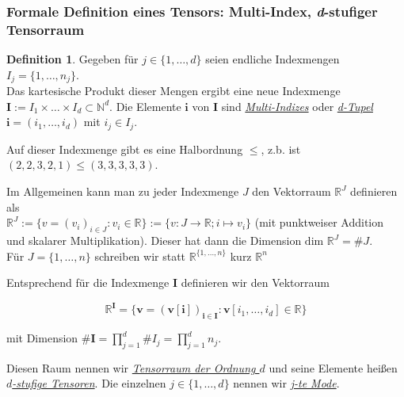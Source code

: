 \documentclass[11pt]{article} %
\theoremstyle{definition}
\newtheorem{definition}[thm]{Definition}
\numberwithin{equation}{section}
\begin{document}
\subsubsection{Formale Definition eines Tensors: Multi-Index, \textit{d}-stufiger Tensorraum}
\begin{changemargin}{0pt}{0pt}
\begin{definition}
Gegeben für $j \in \{1,\dots , d \}$ seien endliche Indexmengen
$I_{j} = \{1,\dots , n_{j} \}$.\\
Das kartesische Produkt dieser Mengen ergibt eine neue Indexmenge $\mathbf{I} := I_{1} \times \dots \times I_{d} \subset \mathbb{N}^{d}.$
Die Elemente $\mathbf{i}$ von $\mathbf{I}$ sind \underline{\textit{Multi-Indizes}} oder \underline{\textit{d-Tupel}}
$\mathbf{i} = (i_{1},\dots , i_{d})$ mit $i_{j} \in I_{j}$.

Auf dieser Indexmenge gibt es eine Halbordnung $\leq$, z.b. ist $(2,2,3,2,1) \leq (3,3,3,3,3)$.

Im Allgemeinen kann man zu jeder Indexmenge $J$ den Vektorraum $\mathbb{R}^{J}$ definieren als\\
$\mathbb{R}^{J} := \{ v = (v_{i})_{i \in J} : v_{i} \in \mathbb{R} \} := \{v : J \rightarrow \mathbb{R}; i \mapsto v_{i} \}$
(mit punktweiser Addition und skalarer Multiplikation). Dieser hat dann die Dimension
$\text{dim } \mathbb{R}^{J} = \#J$.\\
Für $J=\{1,\dots,n\}$ schreiben wir statt $\mathbb{R}^{\{1,\dots,n\}}$ kurz $\mathbb{R}^{n}$

Entsprechend für die Indexmenge $\mathbf{I}$ definieren wir den Vektorraum

\begin{equation} \label{eq:1.1}
\mathbb{R}^{\mathbf{I}} = \{\mathbf{v} = (\mathbf{v[i]})_{\mathbf{i} \in \mathbf{I}} : \mathbf{v}[i_{1},\dots,i_{d}] \in \mathbb{R} \}
\end{equation}

mit Dimension $\#\mathbf{I} = \prod_{j=1}^{d} \#I_{j} = \prod_{j=1}^{d} n_{j}$.

Diesen Raum nennen wir \underline{\textit{Tensorraum der Ordnung $d$}} und seine Elemente heißen\\
\underline{\textit{$d$-stufige Tensoren}}. Die einzelnen $j \in \{1,\dots,d\}$ nennen wir \underline{\textit{j-te Mode}}. \\
\end{definition}


\end{changemargin}
\end{document}
